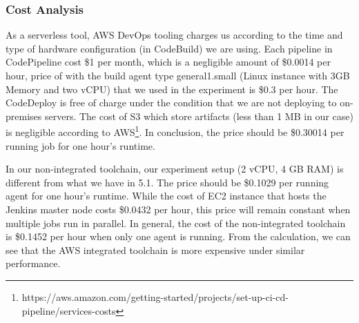  \subsubsection{Cost Analysis}
 As a serverless tool, AWS DevOps tooling charges us according to the time and type of hardware configuration (in CodeBuild) we are using.
  Each pipeline in CodePipeline cost \$1 per month, which is a negligible amount of \$0.0014 per hour, price of with the build agent type general1.small (Linux instance with 3GB Memory and two vCPU) that we used in the experiment is \$0.3 per hour. The CodeDeploy is free of charge under the condition that we are not deploying to on-premises servers. The cost of S3 which store artifacts (less than 1 MB in our case) is negligible according to AWS\footnote{https://aws.amazon.com/getting-started/projects/set-up-ci-cd-pipeline/services-costs}. In conclusion, the price should be \$0.30014 per running job for one hour's runtime.
  \par
  In our non-integrated toolchain, our experiment setup (2 vCPU, 4 GB RAM) is different from what we have in 5.1. The price should be \$0.1029 per running agent for one hour's runtime. While the cost of EC2 instance that hosts the Jenkins master node costs \$0.0432 per hour, this price will remain constant when multiple jobs run in parallel. In general, the cost of the non-integrated toolchain is \$0.1452 per hour when only one agent is running.
From the calculation, we can see that the AWS integrated toolchain is more expensive under similar performance.
